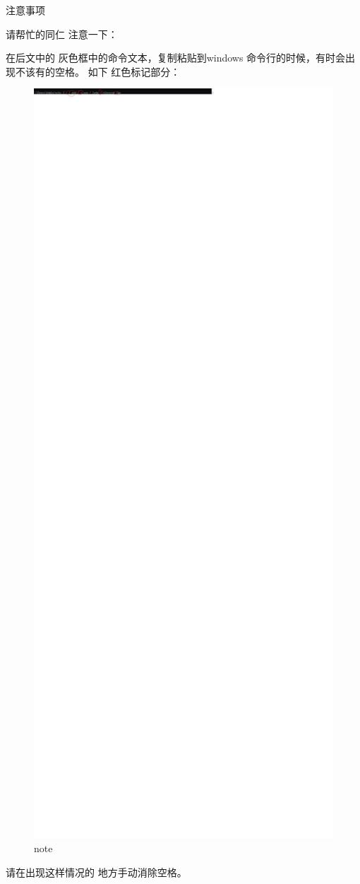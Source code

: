 \begin{frame}[fragile]{注意事项}

请帮忙的同仁 注意一下：

在后文中的 灰色框中的命令文本，复制粘贴到windows 命令行的时候，有时会出现不该有的空格。
如下 红色标记部分：
\begin{figure}[htbp]
\begin{center}
\includegraphics[width=15cm]{img/note}
\caption{note }
\label{note}
\end{center}
\vspace{-0.5em}
\end{figure}

请在出现这样情况的 地方手动消除空格。



\end{frame}
